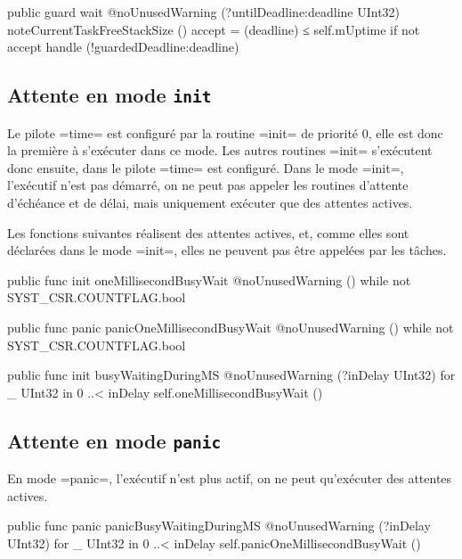 \begin{PLM}
public guard wait @noUnusedWarning (?untilDeadline:deadline UInt32) {
  noteCurrentTaskFreeStackSize ()
  accept = (deadline) ≤ self.mUptime
  if not accept {
    handle (!guardedDeadline:deadline)
  }
}
\end{PLM}

\subsection{Attente en mode \texttt{init}}

Le pilote \plm=time= est configuré par la routine \plm=init= de priorité $0$, elle est donc la première à s'exécuter dans ce mode. Les autres routines \plm=init= s'exécutent donc ensuite, dans le pilote \plm=time= est configuré. Dans le mode \plm=init=, l'exécutif n'est pas démarré, on ne peut pas appeler les routines d'attente d'échéance et de délai, mais uniquement exécuter que des attentes actives.

Les fonctions suivantes réalisent des attentes actives, et, comme elles sont déclarées dans le mode \plm=init=, elles ne peuvent pas être appelées par les tâches.

\begin{PLM}
public func init oneMillisecondBusyWait @noUnusedWarning () {
  while not SYST_CSR.COUNTFLAG.bool {}
}

public func panic panicOneMillisecondBusyWait @noUnusedWarning () {
  while not SYST_CSR.COUNTFLAG.bool {}
}

public func init busyWaitingDuringMS @noUnusedWarning (?inDelay UInt32) {
  for _ UInt32 in 0 ..< inDelay {
    self.oneMillisecondBusyWait ()
  }
}
\end{PLM}



\subsection{Attente en mode \texttt{panic}}

En mode \plm=panic=, l'exécutif n'est plus actif, on ne peut qu'exécuter des attentes actives.

\begin{PLM}
public func panic
panicBusyWaitingDuringMS @noUnusedWarning (?inDelay UInt32) {
  for _ UInt32 in 0 ..< inDelay {
    self.panicOneMillisecondBusyWait ()
  }
}
\end{PLM}














